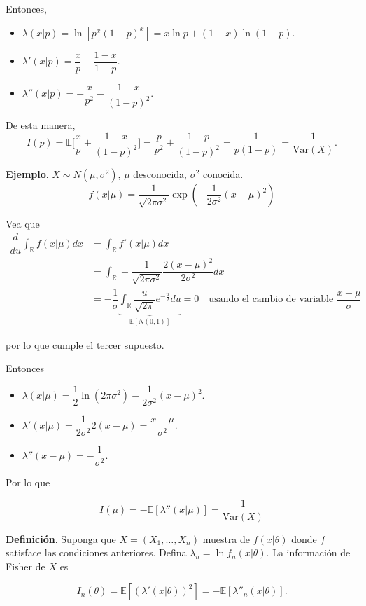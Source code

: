 \documentclass[
  12pt,
]{book}
\begin{document}
Entonces,

\begin{itemize}
\item
  \(\lambda(x|p) = \ln[p^x(1-p)^x] = x\ln p + (1-x)\ln(1-p)\).
\item
  \(\lambda'(x|p) = \dfrac xp-\dfrac{1-x}{1-p}\).
\item
  \(\lambda''(x|p) = -\dfrac x{p^2}-\dfrac{1-x}{(1-p)^2}\).
\end{itemize}

De esta manera,
\[I(p) = \mathbb E\bigg[\dfrac xp + \dfrac{1-x}{(1-p)^2}\bigg] = \dfrac p{p^2}+\dfrac{1-p}{(1-p)^2} = \dfrac 1{p(1-p)} = \dfrac 1{\text{Var}(X)}.\]

\textbf{Ejemplo}. \(X\sim N(\mu,\sigma^2)\), \(\mu\) desconocida, \(\sigma^2\) conocida.
\[f(x|\mu) = \dfrac{1}{\sqrt{2\pi\sigma^2}}\exp\left(-\dfrac 1{2\sigma^2}(x-\mu)^2\right)\]

Vea que
\begin{align*}
\dfrac d{du}\int_{\mathbb R} f(x|\mu)dx & = \int_{\mathbb R}f'(x|\mu)dx\\
& = \int_{\mathbb R} -\dfrac 1{\sqrt{2\pi\sigma^2}}\dfrac {2(x-\mu)^2}{2\sigma^2} dx\\
& = -\dfrac 1\sigma \underbrace{\int_{\mathbb R}\dfrac{u}{\sqrt{2\pi}}e^{-\frac{u}2}du}_{\mathbb E[N(0,1)]} = 0 \quad \text{usando el cambio de variable } \dfrac{x-\mu}\sigma
\end{align*}

por lo que cumple el tercer supuesto.

Entonces

\begin{itemize}
\item
  \(\lambda(x|\mu) = \dfrac 12 \ln (2\pi\sigma^2)-\dfrac 1{2\sigma^2}(x-\mu)^2\).
\item
  \(\lambda'(x|\mu) = \dfrac 1{2\sigma^2}2(x-\mu) = \dfrac{x-\mu}{\sigma^2}\).
\item
  \(\lambda''(x-\mu) = -\dfrac 1{\sigma^2}\).
\end{itemize}

Por lo que

\[I(\mu) = -\mathbb E[\lambda''(x|\mu)] = \dfrac{1}{\text{Var}(X)}\]

\textbf{Definición}. Suponga que \(X = (X_1,\dots,X_n)\) muestra de \(f(x|\theta)\) donde \(f\) satisface las condiciones anteriores. Defina \(\lambda_n = \ln f_n(x|\theta)\). La información de Fisher de \(X\) es

\[I_n(\theta) = \mathbb E[(\lambda'(x|\theta))^2] = - \mathbb E[\lambda''_n(x|\theta)].\]
\end{document}
